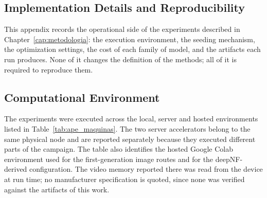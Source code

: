 \documentclass[Ingles]{ic-tese-v3}
\begin{document}
\begin{appendices}{}

\chapter{Implementation Details and Reproducibility}
\label{ape:implementacao}

This appendix records the operational side of the experiments described in
Chapter~\ref{cap:metodologia}: the execution environment, the seeding mechanism, the optimization
settings, the cost of each family of model, and the artifacts each run produces. None of it changes
the definition of the methods; all of it is required to reproduce them.

\section{Computational Environment}
\label{ape:ambiente}

The experiments were executed across the local, server and hosted environments listed in
Table~\ref{tab:ape_maquinas}. The two server accelerators belong to the same physical node and are
reported separately because they executed different parts of the campaign. The table also identifies
the hosted Google Colab environment used for the first-generation image routes and for the
deepNF-derived configuration. The video memory reported there was read from the device at run time;
no manufacturer specification is quoted, since none was verified against the artifacts of this work.


\end{appendices}
\end{document}
